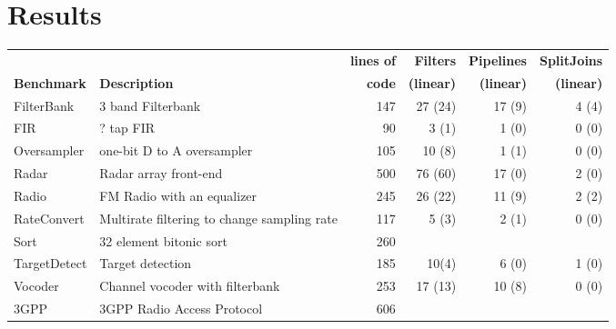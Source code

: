 \section{Results}
\label{sec:results}

\begin{table*}[t]
\begin{center}
\scriptsize
\begin{tabular}{|l|l||r||r|r|r||} \hline
& & {\bf lines of} & {\bf Filters} &  {\bf Pipelines} & {\bf SplitJoins}\\
{\bf Benchmark} & {\bf Description} & {\bf code} & {\bf (linear)} &
 {\bf (linear)} & {\bf (linear)} \\
\hline \hline
FilterBank & 3 band Filterbank & 147 & 27 (24) & 17 (9) & 4 (4)\\ \hline
FIR & ? tap FIR & 90 & 3 (1) & 1 (0) & 0 (0)\\ \hline 
Oversampler & one-bit D to A oversampler & 105 & 10 (8) & 1 (1) & 0 (0)\\ \hline 
Radar & Radar array front-end\cite{pca} & 500 & 76 (60) & 17 (0) & 2 (0)\\ \hline 
Radio & FM Radio with an equalizer & 245 & 26 (22) & 11 (9) & 2 (2)\\ \hline 
RateConvert & Multirate filtering to change sampling rate & 117 & 5 (3) & 2 (1) & 0 (0)\\ \hline 
Sort & 32 element bitonic sort & 260 & & & \\ \hline
TargetDetect & Target detection & 185 & 10(4) & 6 (0) & 1 (0)\\ \hline 
Vocoder & Channel vocoder with filterbank & 253 & 17 (13) & 10 (8) & 0 (0)\\ \hline 
3GPP & 3GPP Radio Access Protocol & 606 & & & \\ \hline
\hline
\end{tabular}
\end{center}
\end{table*}